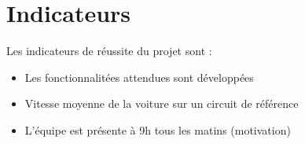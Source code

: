 \documentclass[a4paper,12pt]{article}
\begin{document}
\section{Indicateurs}

Les indicateurs de réussite du projet sont :
\begin{itemize}
    \item Les fonctionnalitées attendues sont développées
    \item Vitesse moyenne de la voiture sur un circuit de référence
    \item L'équipe est présente à 9h tous les matins (motivation)
\end{itemize}
\end{document}
